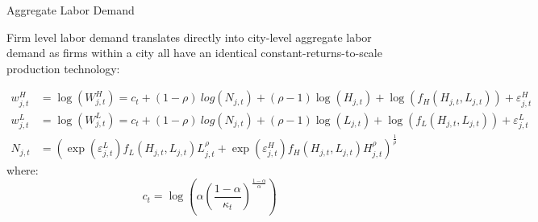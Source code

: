 \documentclass[aspectratio=169]{beamer}
\begin{document}
\begin{frame}{Aggregate Labor Demand}

Firm level labor demand translates directly into city-level aggregate labor demand as firms within a city all have an identical constant-returns-to-scale production technology:

\begin{equation*}
    \begin{split}
        w_{j,t}^{H} &= \log\left( W_{j,t}^H \right) = c_{t} + \left( 1 - \rho \right) \ log\left( N_{j,t} \right) + \left( \rho - 1 \right) \log \left( H_{j,t} \right) + \log\left( f_{H}\left( H_{j,t}, L_{j,t} \right) \right) + \varepsilon_{j,t}^{H} \\
        w_{j,t}^{L} &= \log\left( W_{j,t}^L \right) = c_{t} + \left( 1 - \rho \right) \ log\left( N_{j,t} \right) + \left( \rho - 1 \right) \log \left( L_{j,t} \right) + \log\left( f_{L}\left( H_{j,t}, L_{j,t} \right) \right) + \varepsilon_{j,t}^{L} \\
        N_{j,t} &= \left( \exp\left( \varepsilon_{j,t}^{L} \right) f_{L}\left( H_{j,t}, L_{j,t} \right) L_{j,t}^{\rho} + \exp\left( \varepsilon_{j,t}^{H} \right) f_{H}\left( H_{j,t}, L_{j,t} \right) H_{j,t}^{\rho} \right)^{\frac{1}{\rho}}
    \end{split}
\end{equation*}
where:
\begin{equation*}
    c_{t} = \log\left( \alpha \left( \frac{1 - \alpha}{\kappa_{t}} \right)^{\frac{1 - \alpha}{\alpha}} \right)
\end{equation*}
    
\end{frame}

\end{document}
